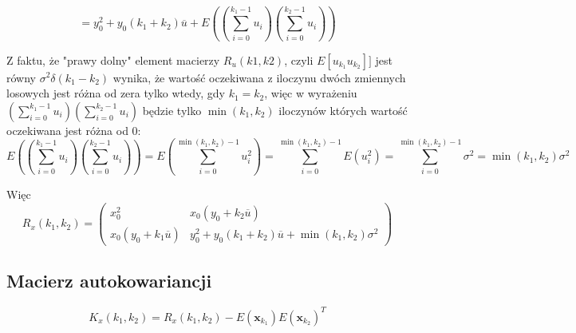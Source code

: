 \documentclass[10pt,a4paper]{article}
\begin{document}
\begin{equation}
     =y_0^2 + y_0(k_1+k_2) \overline{u}+ E \left( \left( \sum \limits_{i=0}^{k_1-1} u_i \right) \left( \sum \limits_{i=0}^{k_2-1} u_i \right) \right)
\end{equation}	

Z faktu, że "prawy dolny" element macierzy $R_u(k1, k2)$, czyli $ E[u_{k_1}u_{k_2}]]$ jest równy
$\sigma^2 \delta(k_1-k_2)$ wynika, że wartość oczekiwana z iloczynu dwóch zmiennych losowych jest różna od zera tylko wtedy, gdy $k_1 = k_2$, więc w wyrażeniu $ \left( \sum \limits_{i=0}^{k_1-1} u_i \right) \left( \sum \limits_{i=0}^{k_2-1} u_i \right) $ będzie tylko $\min(k_1, k_2)$ iloczynów których wartość oczekiwana jest różna od 0:
\begin{equation}
E\left( \left( \sum \limits_{i=0}^{k_1-1} u_i \right) \left( \sum \limits_{i=0}^{k_2-1} u_i \right) \right) = 
E\left( \sum \limits_{i=0}^{ \min(k_1, k_2) -1}  u_i^2 \right) = 	
\sum \limits_{i=0}^{ \min(k_1, k_2) -1} E\left(  u_i^2 \right) = 
\sum \limits_{i=0}^{ \min(k_1, k_2) -1} \sigma ^2 = \min( k_1, k_2 ) \sigma^2  
\end{equation}

Więc
\begin{equation}
R_x(k_1, k_2) =
\left( 
		\begin{matrix}
			x_{0}^2 & x_0(y_{0} + k_2 \overline{u} ) \\
			x_0(y_{0} + k_1 \overline{u}) & y_0^2 + y_0(k_1+k_2) \overline{u}+\min( k_1, k_2 ) \sigma^2
		\end{matrix}			
	\right)
\end{equation}

\subsection*{Macierz autokowariancji}
\begin{equation}
K_x(k_1, k_2) = R_x(k_1, k_2) - E \left( \textbf{x}_{k_1} \right) E \left( \textbf{x}_{k_2} \right) ^T
\end{equation}
\end{document}
